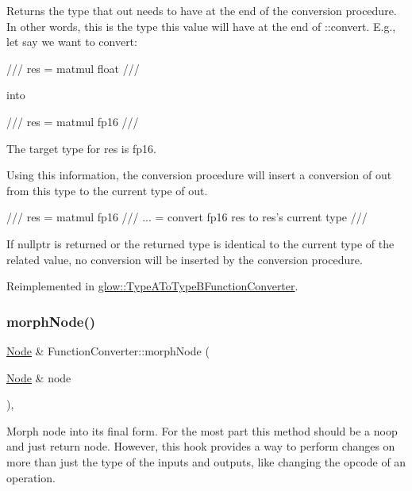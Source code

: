 \begin{DoxyReturn}{Returns}
the type that {\ttfamily out} needs to have at the end of the conversion procedure. In other words, this is the type this value will have at the end of \+::convert. E.\+g., let say we want to convert\+: \begin{DoxyVerb}/// res = matmul float
/// \end{DoxyVerb}
 into \begin{DoxyVerb}/// res = matmul fp16
/// \end{DoxyVerb}
 The target type for res is fp16.
\end{DoxyReturn}
Using this information, the conversion procedure will insert a conversion of {\ttfamily out} from this type to the current type of {\ttfamily out}. \begin{DoxyVerb}/// res = matmul fp16
/// ... = convert fp16 res to res's current type
/// \end{DoxyVerb}
 \begin{DoxyVerb}If nullptr is returned or the returned type is identical to the current
type of the related value, no conversion will be inserted by the
conversion procedure.  \end{DoxyVerb}
 

Reimplemented in \hyperlink{classglow_1_1_type_a_to_type_b_function_converter_a98b9d067d1afe5811ed48d38e5029d63}{glow\+::\+Type\+A\+To\+Type\+B\+Function\+Converter}.

\mbox{\label{classglow_1_1_function_converter_a2e2d68b35109983d63e5b38cabe7b652}} 
\subsubsection{\texorpdfstring{morph\+Node()}{morphNode()}}
{\footnotesize\ttfamily \hyperlink{classglow_1_1_node}{Node} \& Function\+Converter\+::morph\+Node (\begin{DoxyParamCaption}\item[{\hyperlink{classglow_1_1_node}{Node} \&}]{node }\end{DoxyParamCaption})\hspace{0.3cm}{\ttfamily [protected]}, {\ttfamily [virtual]}}

Morph {\ttfamily node} into its final form. For the most part this method should be a noop and just return {\ttfamily node}. However, this hook provides a way to perform changes on more than just the type of the inputs and outputs, like changing the opcode of an operation.

